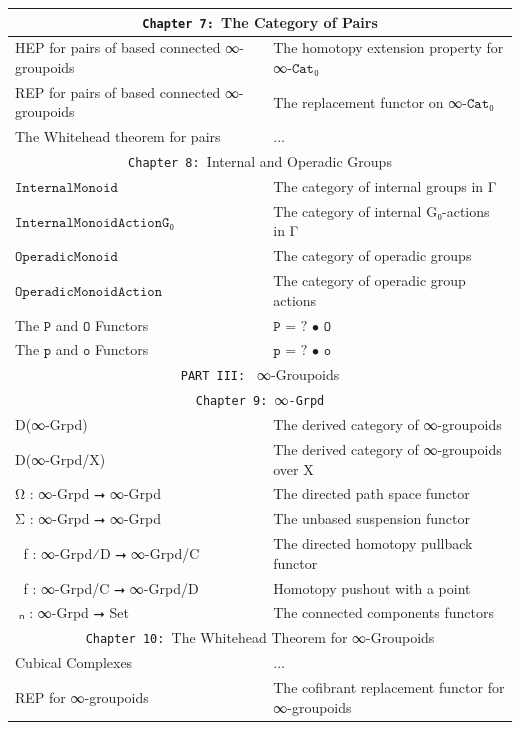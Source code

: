 \documentclass{book}
\theoremstyle{definition}
\begin{document}
{\begin{longtable}{|| l || l ||}
\hline \hline
  \multicolumn{2}{||c||}{\texttt{Chapter 7: }The Category of Pairs} \\
\hline \hline
HEP for pairs of based connected ∞-groupoids & The homotopy extension property for ∞$\texttt{-Cat}$₀\\
 \hline
REP for pairs of based connected ∞-groupoids & The replacement functor on ∞$\texttt{-Cat}$₀ \\
\hline 
The Whitehead theorem for pairs & ... \\
\hline \hline
 \multicolumn{2}{||c||}{\texttt{Chapter 8: }Internal and Operadic Groups} \\
\hline \hline
 $\texttt{InternalMonoid}$   & The category of internal groups in Γ  \\
 \hline
 $\texttt{InternalMonoidActionG₀}$ & The category of internal G₀-actions in Γ   \\
 \hline
  $\texttt{OperadicMonoid}$  & The category of operadic groups  \\
 \hline
 $\texttt{OperadicMonoidAction}$  & The category of operadic group actions  \\
 \hline
  The $\texttt{P}$ and $\texttt{O}$ Functors & $\texttt{P = ? • O}$ \\
 \hline
 The $\texttt{p}$ and $\texttt{o}$ Functors & $\texttt{p = ? • o}$ \\
\hline \hline
\multicolumn{2}{||c||}{\texttt{PART III: } ∞-Groupoids} \\
\hline \hline 
\multicolumn{2}{||c||}{\texttt{Chapter 9: }∞\texttt{-Grpd}}\\
\hline \hline
D(∞-Grpd) & The derived category of ∞-groupoids \\
\hline
D(∞-Grpd/X) & The derived category of ∞-groupoids over X \\
\hline
Ω⃡ : ∞-Grpd ⭢ ∞-Grpd & The directed path space functor \\
 \hline 
Σ⃡ : ∞-Grpd ⭢ ∞-Grpd & The unbased suspension functor \\
 \hline 
ω⃡ f : ∞-Grpd⁄D ⭢ ∞-Grpd/C & The directed homotopy pullback functor\\
\hline 
σ⃡ f : ∞-Grpd/C ⭢ ∞-Grpd/D & Homotopy pushout with a point \\
 \hline 
π⃡ₙ : ∞-Grpd ⭢ Set & The connected components functors\\
 \hline \hline
 \multicolumn{2}{||c||}{\texttt{Chapter 10: }The Whitehead Theorem for ∞-Groupoids} \\
\hline \hline
Cubical Complexes & ...\\
\hline
REP for ∞-groupoids & The cofibrant replacement functor for ∞-groupoids\\

\end{longtable}}
\end{document}
